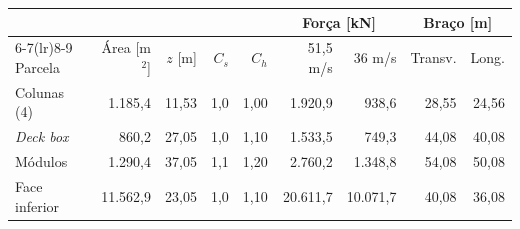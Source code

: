 \begin{tabular}{lrrrrrrrr}
\toprule
 & & & & & \multicolumn{2}{c}{Força [kN]} & \multicolumn{2}{c}{Braço [m]} \\
\cmidrule(lr){6-7}\cmidrule(lr){8-9}
Parcela & Área [m$^2$] & $z$ [m] & $C_s$ & $C_h$ & 51,5 m/s & 36 m/s & Transv. & Long. \\
\midrule
Colunas (4) & 1.185,4 & 11,53 & 1,0 & 1,00 & 1.920,9 & 938,6 & 28,55 & 24,56 \\
\emph{Deck box} & 860,2 & 27,05 & 1,0 & 1,10 & 1.533,5 & 749,3 & 44,08 & 40,08 \\
Módulos & 1.290,4 & 37,05 & 1,1 & 1,20 & 2.760,2 & 1.348,8 & 54,08 & 50,08 \\
Face inferior & 11.562,9 & 23,05 & 1,0 & 1,10 & 20.611,7 & 10.071,7 & 40,08 & 36,08 \\
\bottomrule
\end{tabular}
